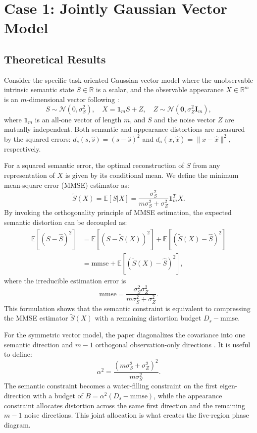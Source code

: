 \documentclass[conference]{IEEEtran}
\begin{document}
\section{Case 1: Jointly Gaussian Vector Model}
\subsection{Theoretical Results}

Consider the specific task-oriented Gaussian vector model where the unobservable intrinsic semantic state $S \in \mathbb{R}$ is a scalar, and the observable appearance $X \in \mathbb{R}^m$ is an $m$-dimensional vector following \cite{liu2021rate}:
\begin{equation}
S \sim \mathcal{N}(0, \sigma_S^2), \quad
X = \mathbf{1}_m S + Z, \quad Z \sim \mathcal{N}(\mathbf{0}, \sigma_Z^2 \mathbf{I}_m),
\end{equation}
where $\mathbf{1}_m$ is an all-one vector of length $m$, and $S$ and the noise vector $Z$ are mutually independent. Both semantic and appearance distortions are measured by the squared errors: $d_s(s, \hat{s}) = (s - \hat{s})^2$ and $d_a(x, \hat{x}) = \|x - \hat{x}\|^2$, respectively.

For a squared semantic error, the optimal reconstruction of $S$ from any representation of $X$ is given by its conditional mean. We define the minimum mean-square error (MMSE) estimator as:
\begin{equation}
\tilde{S}(X) = \mathbb{E}[S|X] = \frac{\sigma_S^2}{m\sigma_S^2 + \sigma_Z^2} \mathbf{1}_m^T X.
\end{equation}
By invoking the orthogonality principle of MMSE estimation, the expected semantic distortion can be decoupled as:
\begin{align}
\mathbb{E}[(S-\hat{S})^2]
&=\mathbb{E}[(S-\tilde{S}(X))^2] + \mathbb{E}[(\tilde{S}(X)-\hat{S})^2] \nonumber\\
&=\text{mmse} + \mathbb{E}[(\tilde{S}(X)-\hat{S})^2],
\label{eq:orthogonal}
\end{align}
where the irreducible estimation error is
\begin{equation}
\text{mmse} = \frac{\sigma_S^2 \sigma_Z^2}{m\sigma_S^2 + \sigma_Z^2}.
\label{eq:gaussian-mmse}
\end{equation}
This formulation shows that the semantic constraint is equivalent to compressing the MMSE estimator $\tilde{S}(X)$ with a remaining distortion budget $D_s-\mathrm{mmse}$.

For the symmetric vector model, the paper diagonalizes the covariance into one semantic direction and $m-1$ orthogonal observation-only directions \cite{liu2021rate}. It is useful to define:
\begin{equation}
\alpha^2=\frac{(m\sigma_S^2+\sigma_Z^2)^2}{m\sigma_S^2}.
\end{equation}
The semantic constraint becomes a water-filling constraint on the first eigen-direction with a budget of $B=\alpha^2(D_s-\mathrm{mmse})$, while the appearance constraint allocates distortion across the same first direction and the remaining $m-1$ noise directions. This joint allocation is what creates the five-region phase diagram.
\end{document}
